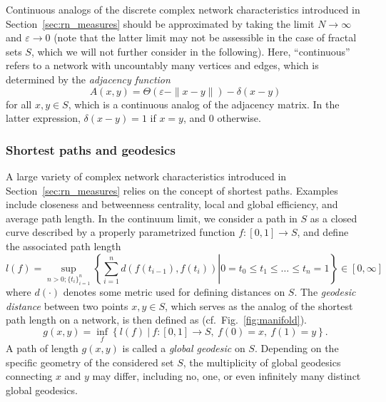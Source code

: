 \documentclass[graybox]{svmult}
\begin{document}
Continuous analogs of the discrete complex network characteristics introduced in Section~\ref{sec:rn_measures} should be approximated by taking the limit $N\to\infty$ and $\varepsilon\to 0$ (note that the latter limit may not be assessible in the case of fractal sets $S$, which we will not further consider in the following). Here, ``continuous'' refers to a network with uncountably many vertices and edges, which is determined by the \emph{adjacency function}
\begin{equation}
A(x,y)=\Theta(\varepsilon-\|x-y\|)-\delta(x-y)
\end{equation}
\noindent
for all $x,y\in S$, which is a continuous analog of the adjacency matrix. In the latter expression, $\delta(x-y)=1$ if $x=y$, and $0$ otherwise.


\subsubsection{Shortest paths and geodesics}

A large variety of complex network characteristics introduced in Section~\ref{sec:rn_measures} relies on the concept of shortest paths. Examples include closeness and betweenness centrality, local and global efficiency, and average path length. In the continuum limit, we consider a path in $S$ as a closed curve described by a properly parametrized function $f:[0,1]\to S$, and define the associated path length 
\begin{equation}
l(f) = \sup_{n>0; \{t_i\}_{i=1}^n} \left.\left\{ \sum_{i=1}^n d(f(t_{i-1}),f(t_i)) \right| 0=t_0\leq t_1\leq\dots\leq t_n=1 \right\} \in[0,\infty] 
\end{equation}
\noindent
where $d(\cdot)$ denotes some metric used for defining distances on $S$. The \textit{geodesic distance} between two points $x,y\in S$, which serves as the analog of the shortest path length on a network, is then defined as (cf.~Fig.~\ref{fig:manifold}).
\begin{equation}
g(x,y) = \inf_f \left\{ l(f)\ |\ f:[0,1]\to S,\ f(0)=x,\ f(1)=y \right\}.
\end{equation}
\noindent
A path of length $g(x,y)$ is called a \emph{global geodesic} on $S$. Depending on the specific geometry of the considered set $S$, the multiplicity of global geodesics connecting $x$ and $y$ may differ, including no, one, or even infinitely many distinct global geodesics.
\end{document}

